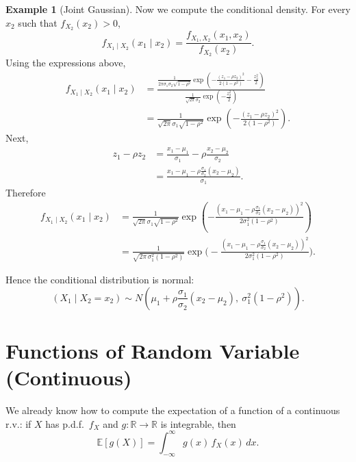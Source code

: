 \documentclass[11pt]{article}
\theoremstyle{plain}
\theoremstyle{definition}
\newtheorem{example}[theorem]{Example}
\theoremstyle{remark}
\begin{document}
\begin{example}[Joint Gaussian]
	Now we compute the conditional density. For every \(x_2\) such that
	\(f_{X_2}(x_2)>0\),
	\[
	f_{X_1\mid X_2}(x_1\mid x_2)
	=
	\frac{f_{X_1,X_2}(x_1,x_2)}{f_{X_2}(x_2)}.
	\]
	Using the expressions above,
	\begin{align*}
		f_{X_1\mid X_2}(x_1\mid x_2)
		&=
		\frac{
			\frac{1}{2\pi\sigma_1\sigma_2\sqrt{1-\rho^2}}
			\exp\!\left(
			-\frac{(z_1-\rho z_2)^2}{2(1-\rho^2)}
			-\frac{z_2^2}{2}
			\right)
		}{
			\frac{1}{\sqrt{2\pi}\sigma_2}
			\exp\!\left(-\frac{z_2^2}{2}\right)
		} \\
		&=
		\frac{1}{\sqrt{2\pi}\sigma_1\sqrt{1-\rho^2}}
		\exp\!\left(
		-\frac{(z_1-\rho z_2)^2}{2(1-\rho^2)}
		\right).
	\end{align*}
	Next,
	\begin{align*}
		z_1-\rho z_2
		&=
		\frac{x_1-\mu_1}{\sigma_1}
		-
		\rho\frac{x_2-\mu_2}{\sigma_2} \\
		&=
		\frac{
			x_1-\mu_1-\rho\frac{\sigma_1}{\sigma_2}(x_2-\mu_2)
		}{\sigma_1}.
	\end{align*}
	Therefore
	\begin{align*}
		f_{X_1\mid X_2}(x_1\mid x_2)
		&=
		\frac{1}{\sqrt{2\pi}\sigma_1\sqrt{1-\rho^2}}
		\exp\!\left(
		-\frac{
			\left(
			x_1-\mu_1-\rho\frac{\sigma_1}{\sigma_2}(x_2-\mu_2)
			\right)^2
		}{
			2\sigma_1^2(1-\rho^2)
		}
		\right) \\
		&=
		\frac{1}{\sqrt{2\pi\,\sigma_1^2(1-\rho^2)}}
		\exp\!\Bigg(
		-\frac{
			\left(
			x_1-\mu_1-\rho\frac{\sigma_1}{\sigma_2}(x_2-\mu_2)
			\right)^2
		}{
			2\sigma_1^2(1-\rho^2)
		}
		\Bigg).
	\end{align*}
	
	Hence the conditional distribution is normal:
	\[
	(X_1\mid X_2=x_2)
	\sim
	N\!\left(
	\mu_1+\rho\frac{\sigma_1}{\sigma_2}(x_2-\mu_2),
	\ \sigma_1^2(1-\rho^2)
	\right).
	\]
\end{example}

	
	
	
	\section{Functions of Random Variable (Continuous)}
	
	We already know how to compute the expectation of a function of a continuous r.v.:  
	if \(X\) has p.d.f.\ \(f_X\) and \(g:\mathbb{R}\to\mathbb{R}\) is integrable, then
	\[
	\mathbb{E}[g(X)]=\int_{-\infty}^{\infty} g(x)\,f_X(x)\,dx.
	\]
	
\end{document}
